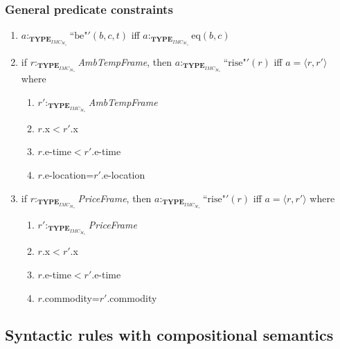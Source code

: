 \subsubsection{General predicate constraints}
\label{pg:predconstraints}
\begin{enumerate} 
 
\item $a:_{\mathbf{TYPE}_{\mathit{IMC}_{\mathscr{M}_n}}}\textrm{``}\mathrm{be}\textrm{"}'(b,c,t)$ iff $a:_{\mathbf{TYPE}_{\mathit{IMC}_{\mathscr{M}_n}}}\mathrm{eq}(b,c)$ 
 
\item if $r:_{\mathbf{TYPE}_{\mathit{IMC}_{\mathscr{M}_n}}}$\textit{AmbTempFrame}, then
  $a:_{\mathbf{TYPE}_{\mathit{IMC}_{\mathscr{M}_n}}}\textrm{``}\mathrm{rise}\textrm{"}'(r)$
  iff $a=\langle r,r'\rangle$ where
\begin{enumerate} 
 
\item $r':_{\mathbf{TYPE}_{\mathit{IMC}_{\mathscr{M}_n}}}$\textit{AmbTempFrame}
 
\item $r$.x$<$$r'$.x

\item $r$.e-time$<$$r'$.e-time

\item $r$.e-location=$r'$.e-location
 
\end{enumerate} 


\item if $r:_{\mathbf{TYPE}_{\mathit{IMC}_{\mathscr{M}_n}}}$\textit{PriceFrame}, then
  $a:_{\mathbf{TYPE}_{\mathit{IMC}_{\mathscr{M}_n}}}\textrm{``}\mathrm{rise}\textrm{"}'(r)$
  iff $a=\langle r,r'\rangle$ where
\begin{enumerate} 
 
\item $r':_{\mathbf{TYPE}_{\mathit{IMC}_{\mathscr{M}_n}}}$\textit{PriceFrame}
 
\item $r$.x$<$$r'$.x

\item $r$.e-time$<$$r'$.e-time

\item $r$.commodity=$r'$.commodity
 
\end{enumerate} 
 
\end{enumerate}

\subsection{Syntactic rules with compositional semantics}

